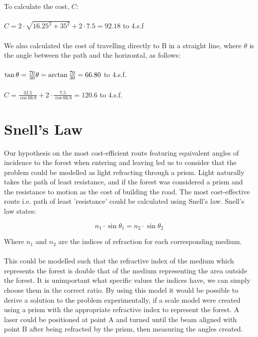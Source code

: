 \documentclass[12pt,a4paper]{article}
\begin{document}
To calculate the cost, $C$:\\
\\
$C=2\cdot\sqrt{16.25^2+35^2}+2\cdot7.5=92.18$ to 4.s.f
\\
\\
We also calculated the cost of travelling directly to B in a straight line, where $\theta$ is the angle between the path and the horizontal, as follows:
\\
\\
$\tan{\theta}=\frac{70}{30}\\
\\
\theta=\arctan{\frac{70}{30}}=66.80$ to 4.s.f.\\
\\
$C=\frac{32.5}{\cos{66.8}}+2\cdot\frac{7.5}{\cos{66.8}}=120.6$ to 4.s.f.

\clearpage
\section*{Snell's Law}
 Our hypothesis on the most cost-efficient route featuring equivalent angles of incidence to the forest when entering and leaving led us to consider that the problem could be modelled as light refracting through a prism. Light naturally takes the path of least resistance, and if the forest was considered a prism and the resistance to motion as the cost of building the road. The most cost-effective route i.e. path of least 'resistance' could be calculated using Snell's law.
 Snell's law states:

\[ n_{1}\cdot\sin{\theta_{1}}=n_{2}\cdot\sin{\theta_{2}}\]

Where $n_{1}$ and $n_{2}$ are the indices of refraction for each corresponding medium.\cite{UniversityofBritishColumbia}\\
\\
\indent This could be modelled such that the refractive index of the medium which represents the forest is double that of the medium representing the area outside the forest. It is unimportant what specific values the indices have, we can simply choose them in the correct ratio. By using this model it would be possible to derive a solution to the problem experimentally, if a scale model were created using a prism with the appropriate refractive index to represent the forest. A laser could be positioned at point A and turned until the beam aligned with point B after being refracted by the prism, then measuring the angles created.

\end{document}
